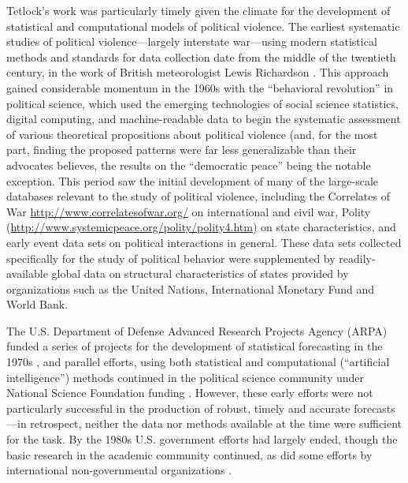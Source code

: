 \documentclass[graybox]{svmult}
\begin{document}
Tetlock's work was particularly timely given the climate for the development of statistical and computational models of political violence. The earliest systematic studies of political violence---largely interstate war---using modern statistical methods and standards for data collection date from the middle of the twentieth century, in the work of British meteorologist Lewis Richardson \cite{RichardsonSDQ60}. This approach gained considerable momentum in the 1960s with the ``behavioral revolution'' in political science, which used the emerging technologies of social science statistics, digital computing, and machine-readable data to begin the systematic assessment of various theoretical propositions about political violence (and, for the most part, finding the proposed patterns were far less generalizable than their advocates believes, the results on the ``democratic peace'' {\color{blue}{[someone have a handy citation or two here?]}}being the notable exception. This period saw the initial development of many of the large-scale databases relevant to the study of political violence, including the Correlates of War 
 \url{http://www.correlatesofwar.org/} on international and civil war, Polity (\url{http://www.systemicpeace.org/polity/polity4.htm}) on state characteristics, and early event data sets \cite{BurgLawt72,Azar80, McClelland76,Leng87} on political interactions in general. These data sets collected specifically for the study of political behavior were supplemented by readily-available global data on structural characteristics of states provided by organizations such as the United Nations, International Monetary Fund and World Bank.

The U.S. Department of Defense Advanced Research Projects Agency (ARPA) funded a series of projects for the development of statistical forecasting in the 1970s \cite{AndrHopp84,DalAnd80,HoppAndrFree84}, and parallel efforts, using both statistical and computational (``artificial intelligence'') methods continued in the political science community under National Science Foundation funding \cite{ChoucriRobinson79,Hudson91,SylvChan84,GurrLich86}. However, these early efforts were not particularly successful in the production of robust, timely and accurate forecasts---in retrospect, neither the data nor methods available at the time were sufficient for the task. By the 1980s U.S. government efforts had largely ended, though the basic research in the academic community continued, as did some efforts by international non-governmental organizations \cite{HarffGurr98,DaviesGurr98,GurrHarf94,RupeKuro92}.
\end{document}
